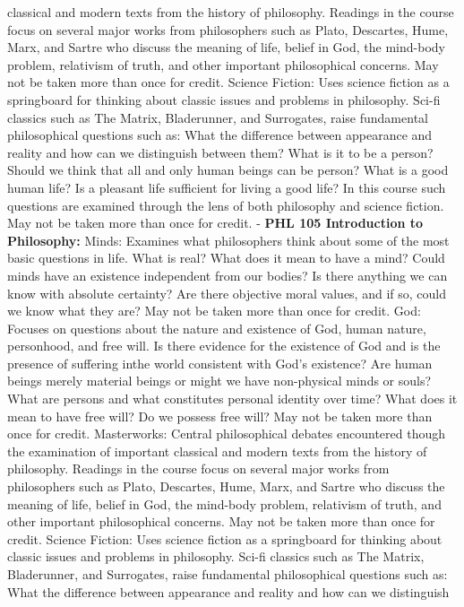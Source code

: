 \documentclass[
  letterpaper,
]{scrbook}
\begin{document}
classical and modern texts from the history of philosophy. Readings in
the course focus on several major works from philosophers such as Plato,
Descartes, Hume, Marx, and Sartre who discuss the meaning of life,
belief in God, the mind-body problem, relativism of truth, and other
important philosophical concerns. May not be taken more than once for
credit. Science Fiction: Uses science fiction as a springboard for
thinking about classic issues and problems in philosophy. Sci-fi
classics such as The Matrix, Bladerunner, and Surrogates, raise
fundamental philosophical questions such as: What the difference between
appearance and reality and how can we distinguish between them? What is
it to be a person? Should we think that all and only human beings can be
person? What is a good human life? Is a pleasant life sufficient for
living a good life? In this course such questions are examined through
the lens of both philosophy and science fiction. May not be taken more
than once for credit. - \textbf{PHL 105 Introduction to Philosophy:}
Minds: Examines what philosophers think about some of the most basic
questions in life. What is real? What does it mean to have a mind? Could
minds have an existence independent from our bodies? Is there anything
we can know with absolute certainty? Are there objective moral values,
and if so, could we know what they are? May not be taken more than once
for credit. God: Focuses on questions about the nature and existence of
God, human nature, personhood, and free will. Is there evidence for the
existence of God and is the presence of suffering inthe world consistent
with God's existence? Are human beings merely material beings or might
we have non-physical minds or souls? What are persons and what
constitutes personal identity over time? What does it mean to have free
will? Do we possess free will? May not be taken more than once for
credit. Masterworks: Central philosophical debates encountered though
the examination of important classical and modern texts from the history
of philosophy. Readings in the course focus on several major works from
philosophers such as Plato, Descartes, Hume, Marx, and Sartre who
discuss the meaning of life, belief in God, the mind-body problem,
relativism of truth, and other important philosophical concerns. May not
be taken more than once for credit. Science Fiction: Uses science
fiction as a springboard for thinking about classic issues and problems
in philosophy. Sci-fi classics such as The Matrix, Bladerunner, and
Surrogates, raise fundamental philosophical questions such as: What the
difference between appearance and reality and how can we distinguish
\end{document}
